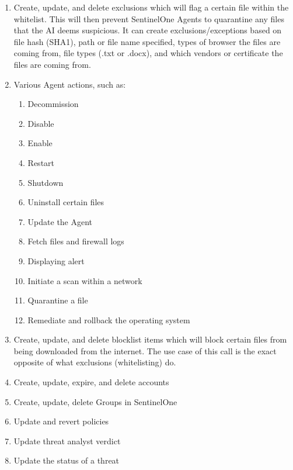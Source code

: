 \begin{enumerate}
      \item Create, update, and delete exclusions which will flag a certain file within the whitelist. This will then prevent SentinelOne Agents to quarantine any files that the
            AI deems suspicious. It can create exclusions/exceptions based on file hash (SHA1), path or file name specified, types of browser the files are coming from, file types
            (.txt or .docx), and which vendors or certificate the files are coming from.
      \item Various Agent actions, such as:
            \begin{enumerate}
                  \item Decommission
                  \item Disable
                  \item Enable
                  \item Restart
                  \item Shutdown
                  \item Uninstall certain files
                  \item Update the Agent
                  \item Fetch files and firewall logs
                  \item Displaying alert
                  \item Initiate a scan within a network
                  \item Quarantine a file
                  \item Remediate and rollback the operating system
            \end{enumerate}
      \item Create, update, and delete blocklist items which will block certain files from being downloaded from the internet. The use case of this call is the exact opposite
            of what exclusions (whitelisting) do.
      \item Create, update, expire, and delete accounts
      \item Create, update, delete Groups in SentinelOne
      \item Update and revert policies
      \item Update threat analyst verdict
      \item Update the status of a threat

\end{enumerate}


